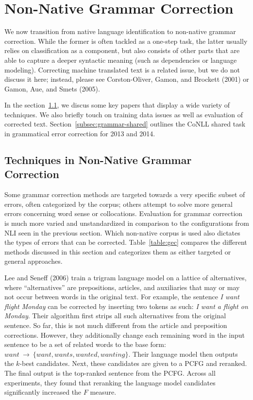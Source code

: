 \section{Non-Native Grammar Correction}
\label{sec:grammar}

We now transition from native language identification to non-native grammar
correction. While the former is often tackled as a one-step task, the latter
usually relies on classification as a component, but also consists of other
parts that are able to capture a deeper syntactic meaning (such as dependencies
or language modeling). Correcting machine translated text is a related issue,
but we do not discuss it here; instead, please see Corston-Oliver, Gamon, and
Brockett (2001) or Gamon, Aue, and Smets (2005).

In the section~\ref{subsec:grammar}, we discus some key papers that display a
wide variety of techniques. We also briefly touch on training data issues as
well as evaluation of corrected text. Section~\ref{subsec:grammar-shared}
outlines the CoNLL shared task in grammatical error correction for 2013 and
2014.

\subsection{Techniques in Non-Native Grammar Correction}
\label{subsec:grammar}

Some grammar correction methods are targeted towards a very specific subset of
errors, often categorized by the corpus; others attempt to solve more general
errors concerning word sense or collocations. Evaluation for grammar correction
is much more varied and unstandardized in comparison to the configurations from
NLI seen in the previous section. Which non-native corpus is used also dictates
the types of errors that can be corrected. Table~\ref{table:gec} compares the
different methods discussed in this section and categorizes them as either
targeted or general approaches.

Lee and Seneff (2006) train a trigram language model on a lattice of alternatives,
where ``alternatives'' are prepositions, articles, and auxiliaries that may or
may not occur between words in the original text. For example, the sentence
\emph{I want flight Monday} can be corrected by inserting two tokens as such:
\emph{I want a flight on Monday}. Their algorithm first strips all such
alternatives from the original sentence. So far, this is not much different from
the article and preposition corrections. However, they additionally change each
remaining word in the input sentence to be a set of related words to the base
form: $want~\rightarrow~\{want, wants, wanted, wanting\}$. Their language model
then outputs the $k$-best candidates. Next, these candidates are given to a PCFG
and reranked. The final output is the top-ranked sentence from the PCFG\@.
Across all experiments, they found that reranking the language model candidates
significantly increased the $F$ measure.

